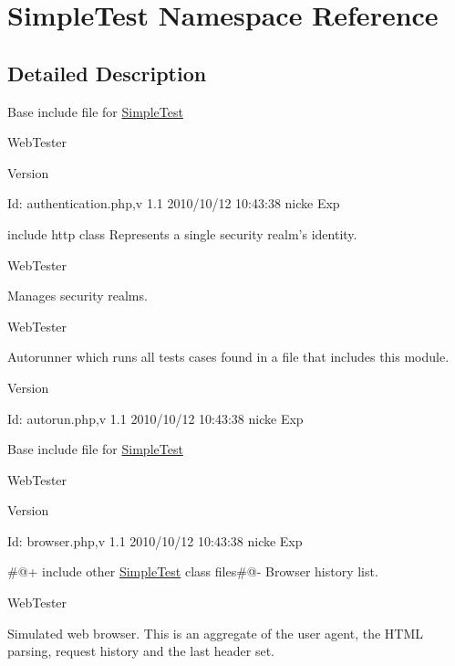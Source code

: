 \hypertarget{namespace_simple_test}{
\section{SimpleTest Namespace Reference}
\label{namespace_simple_test}
}


\subsection{Detailed Description}
Base include file for \hyperlink{class_simple_test}{SimpleTest}

WebTester \begin{DoxyVersion}{Version}

\end{DoxyVersion}
\begin{DoxyParagraph}{Id:}
authentication.php,v 1.1 2010/10/12 10:43:38 nicke Exp 
\end{DoxyParagraph}


include http class Represents a single security realm's identity.

WebTester

Manages security realms.

WebTester

Autorunner which runs all tests cases found in a file that includes this module.

\begin{DoxyVersion}{Version}

\end{DoxyVersion}
\begin{DoxyParagraph}{Id:}
autorun.php,v 1.1 2010/10/12 10:43:38 nicke Exp 
\end{DoxyParagraph}


Base include file for \hyperlink{class_simple_test}{SimpleTest}

WebTester \begin{DoxyVersion}{Version}

\end{DoxyVersion}
\begin{DoxyParagraph}{Id:}
browser.php,v 1.1 2010/10/12 10:43:38 nicke Exp 
\end{DoxyParagraph}


\#@+ include other \hyperlink{class_simple_test}{SimpleTest} class files\#@-\/ Browser history list.

WebTester

Simulated web browser. This is an aggregate of the user agent, the HTML parsing, request history and the last header set.

